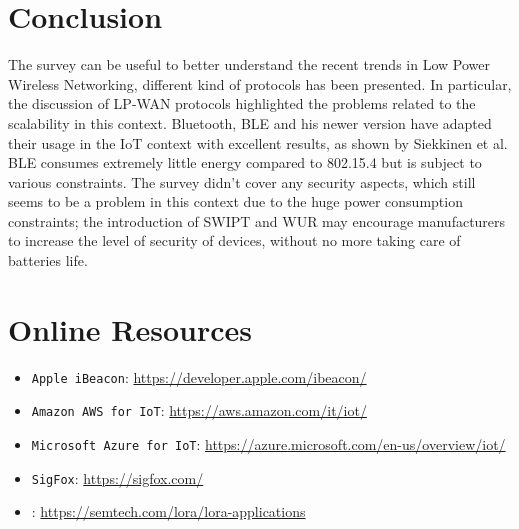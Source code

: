 \documentclass[sigconf]{acmart}
\begin{document}
    \section{Conclusion}
    The survey can be useful to better understand the recent trends in Low Power Wireless Networking, different kind of protocols has been presented. In particular, the discussion of LP-WAN protocols highlighted the problems related to the scalability in this context. Bluetooth, BLE and his newer version have adapted their usage in the IoT context with excellent results, as shown by Siekkinen et al. \cite{siekkinen} BLE consumes extremely little energy compared to 802.15.4 but is subject to various constraints. The survey didn't cover any security aspects, which still seems to be a problem in this context due to the huge power consumption constraints; the introduction of SWIPT and WUR may encourage manufacturers to increase the level of security of devices, without no more taking care of batteries life.
   
    
    
    
    \appendix
\section{Online Resources}

\begin{itemize}
\item {\verb|Apple iBeacon|}: \url{https://developer.apple.com/ibeacon/}
\item {\verb|Amazon AWS for IoT|}: \url{https://aws.amazon.com/it/iot/}
\item {\verb|Microsoft Azure for IoT|}: \url{https://azure.microsoft.com/en-us/overview/iot/}
\item {\verb|SigFox|}: \url{https://sigfox.com/}
\item {}: \url{https://semtech.com/lora/lora-applications}

\end{itemize}
\end{document}
